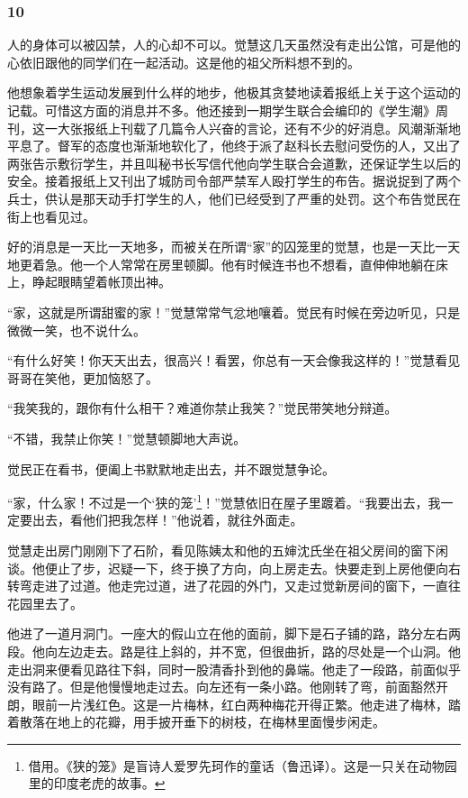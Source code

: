 \subsubsection*{10}

\par 人的身体可以被囚禁，人的心却不可以。觉慧这几天虽然没有走出公馆，可是他的心依旧跟他的同学们在一起活动。这是他的祖父所料想不到的。
\par 他想象着学生运动发展到什么样的地步，他极其贪婪地读着报纸上关于这个运动的记载。可惜这方面的消息并不多。他还接到一期学生联合会编印的《学生潮》周刊，这一大张报纸上刊载了几篇令人兴奋的言论，还有不少的好消息。风潮渐渐地平息了。督军的态度也渐渐地软化了，他终于派了赵科长去慰问受伤的人，又出了两张告示敷衍学生，并且叫秘书长写信代他向学生联合会道歉，还保证学生以后的安全。接着报纸上又刊出了城防司令部严禁军人殴打学生的布告。据说捉到了两个兵士，供认是那天动手打学生的人，他们已经受到了严重的处罚。这个布告觉民在街上也看见过。
\par 好的消息是一天比一天地多，而被关在所谓“家”的囚笼里的觉慧，也是一天比一天地更着急。他一个人常常在房里顿脚。他有时候连书也不想看，直伸伸地躺在床上，睁起眼睛望着帐顶出神。
\par “家，这就是所谓甜蜜的家！”觉慧常常气忿地嚷着。觉民有时候在旁边听见，只是微微一笑，也不说什么。
\par “有什么好笑！你天天出去，很高兴！看罢，你总有一天会像我这样的！”觉慧看见哥哥在笑他，更加恼怒了。
\par “我笑我的，跟你有什么相干？难道你禁止我笑？”觉民带笑地分辩道。
\par “不错，我禁止你笑！”觉慧顿脚地大声说。
\par 觉民正在看书，便阖上书默默地走出去，并不跟觉慧争论。
\par “家，什么家！不过是一个‘狭的笼’\footnote{借用。《狭的笼》是盲诗人爱罗先珂作的童话（鲁迅译）。这是一只关在动物园里的印度老虎的故事。}！”觉慧依旧在屋子里踱着。“我要出去，我一定要出去，看他们把我怎样！”他说着，就往外面走。
\par 觉慧走出房门刚刚下了石阶，看见陈姨太和他的五婶沈氏坐在祖父房间的窗下闲谈。他便止了步，迟疑一下，终于换了方向，向上房走去。快要走到上房他便向右转弯走进了过道。他走完过道，进了花园的外门，又走过觉新房间的窗下，一直往花园里去了。
\par 他进了一道月洞门。一座大的假山立在他的面前，脚下是石子铺的路，路分左右两段。他向左边走去。路是往上斜的，并不宽，但很曲折，路的尽处是一个山洞。他走出洞来便看见路往下斜，同时一股清香扑到他的鼻端。他走了一段路，前面似乎没有路了。但是他慢慢地走过去。向左还有一条小路。他刚转了弯，前面豁然开朗，眼前一片浅红色。这是一片梅林，红白两种梅花开得正繁。他走进了梅林，踏着散落在地上的花瓣，用手披开垂下的树枝，在梅林里面慢步闲走。
